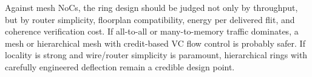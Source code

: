 \documentclass[11pt]{article}
\begin{document}
Against mesh NoCs, the ring design should be judged not only by throughput, but by router simplicity, floorplan compatibility, energy per delivered flit, and coherence verification cost. If all-to-all or many-to-memory traffic dominates, a mesh or hierarchical mesh with credit-based VC flow control is probably safer. If locality is strong and wire/router simplicity is paramount, hierarchical rings with carefully engineered deflection remain a credible design point.



\end{document}
